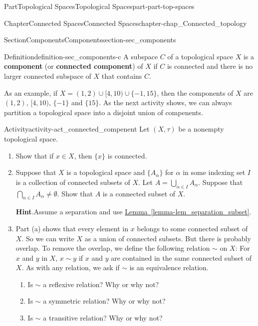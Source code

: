 \documentclass[oneside,10pt,]{book}
\newcommand{\blocktitlefont}{\relax}
\newcommand{\xreffont}{\relax}
\newcommand{\terminology}[1]{\textbf{#1}}
\numberwithin{equation}{chapter}
\begin{document}
\begin{partptx}{Part}{Topological Spaces}{}{Topological Spaces}{}{}{part-part-top-spaces}
\begin{chapterptx}{Chapter}{Connected Spaces}{}{Connected Spaces}{}{}{chapter-chap_Connected_topology}
\begin{sectionptx}{Section}{Components}{}{Components}{}{}{section-sec_components}
\begin{definition}{Definition}{}{definition-sec_components-c}
%
A subspace \(C\) of a topological space \(X\) is a \terminology{component} (or \terminology{connected component}) of \(X\) if \(C\) is connected and there is no larger connected subspace of \(X\) that contains \(C\).%
\end{definition}
As an example, if \(X = (1,2) \cup [4,10) \cup \{-1,15\}\), then the components of \(X\) are \((1,2)\), \([4,10)\), \(\{-1\}\) and \(\{15\}\). As the next activity shows, we can always partition a topological space into a disjoint union of compenents.%
\begin{activity}{Activity}{}{activity-act_connected_compenent}%
Let \((X, \tau)\) be a nonempty topological space.%
\begin{enumerate}[font=\bfseries,label=(\alph*),ref=\alph*]%
\item{}Show that if \(x \in X\), then \(\{x\}\) is connected.%
\item{}Suppose that \(X\) is a topological space and \(\{A_{\alpha}\}\) for \(\alpha\) in some indexing set \(I\) is a collection of connected subsets of \(X\). Let \(A = \bigcup_{\alpha \in I} A_{\alpha}\). Suppose that \(\bigcap_{\alpha \in I} A_{\alpha} \neq \emptyset\). Show that \(A\) is a connected subset of \(X\).%
\par\smallskip%
\noindent\textbf{\blocktitlefont Hint}.\hypertarget{hint-act_connected_compenent-c-b}{}\quad{}Assume a separation and use \hyperref[lemma-lem_separation_subset]{Lemma~{\xreffont\ref{lemma-lem_separation_subset}}}.%
\item{}Part (a) shows that every element in \(x\) belongs to some connected subset of \(X\). So we can write \(X\) as a union of connected subsets. But there is probably overlap. To remove the overlap, we define the following relation \(\sim\) on \(X\): For \(x\) and \(y\) in \(X\), \(x \sim y\) if \(x\) and \(y\) are contained in the same connected subset of \(X\). As with any relation, we ask if \(\sim\) is an equivalence relation.%
\begin{enumerate}[font=\bfseries,label=(\roman*),ref=\theenumi.\roman*]%
\item{}Is \(\sim\) a reflexive relation? Why or why not?%
\item{}Is \(\sim\) a symmetric relation? Why or why not?%
\item{}Is \(\sim\) a transitive relation? Why or why not?%
\end{enumerate}%
\end{enumerate}%
\end{activity}%

\end{sectionptx}
\end{chapterptx}
\end{partptx}
\end{document}
